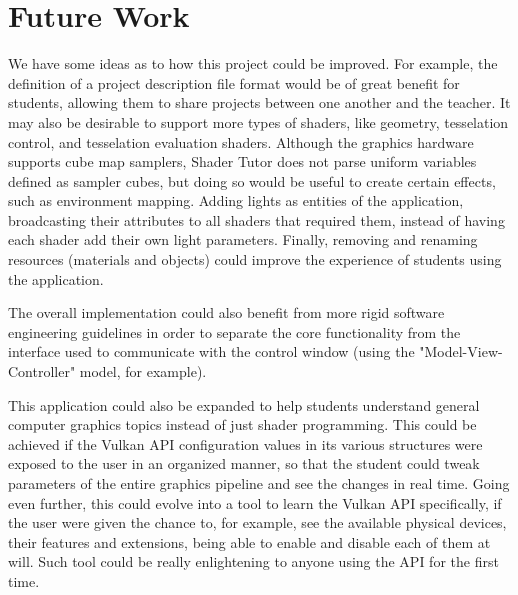 \chapter{Future Work}
We have some ideas as to how this project could be improved. For example, the definition of a project description file format would be of great benefit for students, allowing them to share projects between one another and the teacher. It may also be desirable to support more types of shaders, like geometry, tesselation control, and tesselation evaluation shaders. Although the graphics hardware supports cube map samplers, Shader Tutor does not parse uniform variables defined as sampler cubes, but doing so would be useful to create certain effects, such as environment mapping. Adding lights as entities of the application, broadcasting their attributes to all shaders that required them, instead of having each shader add their own light parameters. Finally, removing and renaming resources (materials and objects) could improve the experience of students using the application.

The overall implementation could also benefit from more rigid software engineering guidelines in order to separate the core functionality from the interface used to communicate with the control window (using the "Model-View-Controller" model, for example).

This application could also be expanded to help students understand general computer graphics topics instead of just shader programming. This could be achieved if the Vulkan API configuration values in its various structures were exposed to the user in an organized manner, so that the student could tweak parameters of the entire graphics pipeline and see the changes in real time. Going even further, this could evolve into a tool to learn the Vulkan API specifically, if the user were given the chance to, for example, see the available physical devices, their features and extensions, being able to enable and disable each of them at will. Such tool could be really enlightening to anyone using the API for the first time.
